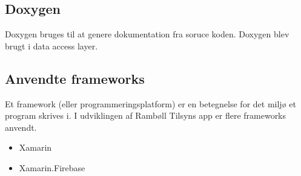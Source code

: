 \subsection*{Doxygen}
Doxygen \cite{DoxygenInfo} bruges til at genere dokumentation fra soruce koden. Doxygen blev brugt i data access layer.   

\subsection*{Anvendte frameworks} 
Et framework (eller programmeringsplatform) er en betegnelse for det miljø 
et program skrives i. I udviklingen af Rambøll Tilsyns app
er flere frameworks anvendt.
\begin{itemize}[-]
	\item Xamarin \cite{XamarinDoc}
	\item Xamarin.Firebase \cite{FirebaseDoc}
	
	
\end{itemize}
